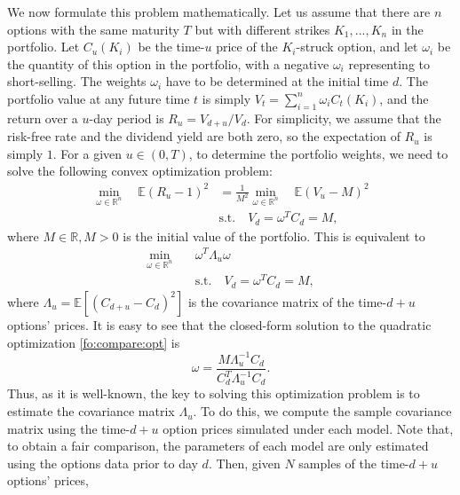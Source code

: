 \documentclass{article}
\numberwithin{equation}{section}
\newcommand\EE {\mathbb E}
\newcommand\RR {\mathbb R}
\begin{document}
We now formulate this problem mathematically. Let us assume that there are $n$ options with the same maturity $T$ but with different strikes $K_1,...,K_n$ in the portfolio. Let $C_u(K_i)$ be the time-$u$ price of the $K_i$-struck option, and let $\omega_i$ be the quantity of this option in the portfolio, with a negative $\omega_i$ representing to short-selling. The weights $\omega_i$ have to be determined at the initial time $d$. The portfolio value at any future time $t$ is simply $V_t = \sum_{i=1}^n \omega_i C_t(K_i)$, and the return over a $u$-day period is $R_u = V_{d+u}/V_d$. For simplicity, we assume that the risk-free rate and the dividend yield are both zero, so the expectation of $R_u$ is simply $1$. For a given $u\in(0,T)$, to determine the portfolio weights, we need to solve the following convex optimization problem: 
\begin{align*}
\min_{\omega \in \mathbb{R}^n} \quad \EE(R_u - 1)^2 
&= \frac{1}{M^2} \min_{\omega \in \mathbb{R}^n} \quad \EE(V_u - M)^2 \\
& \text{s.t.} \quad V_d = \omega^T C_d = M, 
\end{align*}
where $M \in \RR, M > 0$ is the initial value of the portfolio. This is equivalent to 
\begin{align}\label{fo:compare:opt}
\min_{\omega \in \mathbb{R}^n} \quad & \omega^T \Lambda_u \omega\\
& \text{s.t.} \quad V_d = \omega^T C_d = M, \nonumber
\end{align}
where $\Lambda_u = \EE[(C_{d+u} - C_d)^2]$ is the covariance matrix of the time-$d+u$ options' prices.  It is easy to see that the closed-form solution to the quadratic optimization \eqref{fo:compare:opt} is
\begin{equation}\label{fo:compare:weights}
\omega = \frac{ M\Lambda_u^{-1} C_d}{C_d^T \Lambda_u^{-1}C_d}.
\end{equation}
Thus, as it is well-known, the key to solving this optimization problem is to estimate the covariance matrix $\Lambda_u$. To do this, we compute the sample covariance matrix using the time-$d+u$ option prices simulated under each model. Note that, to obtain a fair comparison, the parameters of each model are only estimated using the options data prior to day $d$. Then, given $N$ samples of the time-$d+u$ options' prices, 
\end{document}
